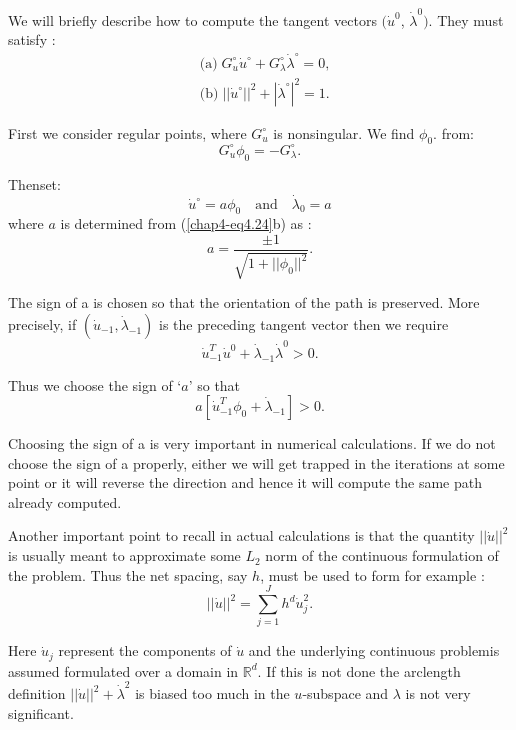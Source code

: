  We will briefly describe how to compute the tangent vectors
 $(\dot{u}^0$, $\dot{\lambda}^0)$. They must
 satisfy : 
\begin{equation*}
\begin{split}
& \text{(a)} \;  G^\circ_u \dot{u}^\circ + G^\circ_\lambda
\dot{\lambda}^\circ = 0,\\ 
& \text{(b)} \; || \dot{u}^\circ ||^2 + | \dot{\lambda}^\circ|^2 = 1. 
\end{split}\tag{4.24}\label{chap4-eq4.24}
\end{equation*}
 
First we consider regular points, where $G^\circ_u $ is
nonsingular. We find $\phi_0$. from: 
\begin{equation*}
 G_u^\circ \phi_0 = - G_\lambda^\circ. \tag{4.25}\label{chap4-eq4.25}
\end{equation*}

Then\pageoriginale set:
\begin{equation*}
\dot{u}^\circ = a \phi_0 \quad \text{and}  \quad \dot{\lambda}_0 = a
\tag{4.26}\label{chap4-eq4.26} 
\end{equation*} 
where $a$ is determined from (\ref{chap4-eq4.24}b) as :
\begin{equation*}
a=\frac{\pm 1}{\sqrt{1+|| \phi_0 ||^2}}. \tag{4.27}\label{chap4-eq4.27}
\end{equation*} 
 
The sign of a is chosen so that the orientation of the path is
preserved. More precisely, if $ (\dot{u}_{-1}, \dot{\lambda}_{-1})$
is the preceding tangent vector then we require 
$$
\dot{u}^T_{-1} \dot{u}^0 + \dot{\lambda}_{-1}
\dot{\lambda}^0> 0.  
$$
 
 Thus we choose the sign of `$a$' so that
 $$
 a[\dot{u}^{T}_{-1}\phi_0 + \dot{\lambda}_{-1}]>0. 
 $$

 Choosing the sign of a is very important in numerical
 calculations. If we do not choose the sign of a properly, either we
 will get trapped in the iterations at some point or it will reverse
 the direction and hence it will compute the same path already
 computed. 
 
 Another important point to recall in actual calculations  is that the
 quantity $||\dot {u}||^2$ is usually meant to approximate some $L_2$
 norm of the continuous formulation of the problem. Thus the net
 spacing, say $h$, must be used to form for example : 
$$
|| \dot{u}||^2 = \sum _{j=1}^J h^d \dot{u}_j^2. 
$$
 
Here $\dot{u}_j$ represent  the components of $\dot{u}$ and the
underlying continuous problem\pageoriginale is assumed formulated over
a domain in 
$\mathbb{R}^d$. If this is not done the arclength definition
$||\dot{u}||^2 + \dot{\lambda}^2$ is biased too much in the
$u$-subspace and $\lambda$ is not very significant. 
 
